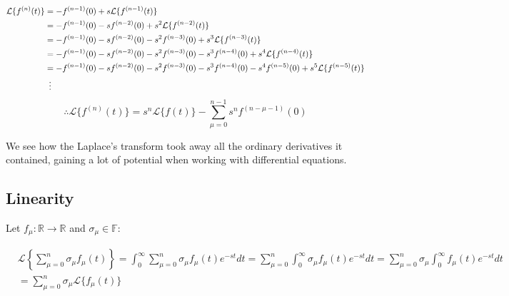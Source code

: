 \documentclass[12pt]{article}
\begin{document}
	\[
		\begin{aligned}
			\mathcal{L}\{f^{(n)}(t)\}
			& = -f^{(n - 1)}(0) + s \mathcal{L}\{f^{(n - 1)}(t)\} \\
			& = -f^{(n - 1)}(0) - s f^{(n - 2)}(0) + s^2\mathcal{L}\{f^{(n - 2)}(t)\} \\
			& = -f^{(n - 1)}(0) - s f^{(n - 2)}(0) - s^2 f^{(n - 3)}(0) + s^3\mathcal{L}\{f^{(n - 3)}(t)\} \\
			& = -f^{(n - 1)}(0) - s f^{(n - 2)}(0) - s^2 f^{(n - 3)}(0) - s^3 f^{(n - 4)}(0) + s^4\mathcal{L}\{f^{(n - 4)}(t)\} \\
			& = -f^{(n - 1)}(0) - s f^{(n - 2)}(0) - s^2 f^{(n - 3)}(0) - s^3 f^{(n - 4)}(0) - s^4 f^{(n - 5)}(0) + s^5\mathcal{L}\{f^{(n - 5)}(t)\} \\
			& \hspace{0.5em} \vdots
		\end{aligned}
	\]
	\[
		\therefore \mathcal{L}\{f^{(n)}(t)\}
		= s^n \mathcal{L}\{f(t)\} - \sum_{\mu = 0}^{n - 1} s^n f^{(n - \mu - 1)}(0)
	\]
	
	We see how the Laplace's transform took away all the ordinary derivatives it contained, gaining a lot of potential when working with differential equations.
	
	\subsection{Linearity}
	
	Let $f_\mu : \mathbb{R} \to \mathbb{R}$ and $\sigma_\mu \in \mathbb{F}$:
	
	\[
		\begin{aligned}
			& \mathcal{L} \left\{ \sum_{\mu = 0}^n \sigma_\mu f_\mu(t) \right\}
			= \int_0^\infty \sum_{\mu = 0}^n \sigma_\mu f_\mu(t) e^{-st} dt
			= \sum_{\mu = 0}^n \int_0^\infty \sigma_\mu f_\mu(t) e^{-st} dt
			= \sum_{\mu = 0}^n \sigma_\mu \int_0^\infty f_\mu(t) e^{-st} dt
			\\
			& = \sum_{\mu = 0}^n \sigma_\mu \mathcal{L}\{f_\mu(t)\}
		\end{aligned}	
	\]
\end{document}
